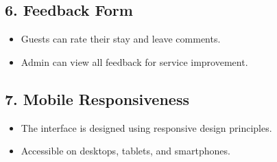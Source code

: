 \documentclass[a4paper,12pt]{article}
\begin{document}
\subsection{6. Feedback Form}
\begin{itemize}
    \item Guests can rate their stay and leave comments.
    \item Admin can view all feedback for service improvement.
\end{itemize}

\subsection{7. Mobile Responsiveness}
\begin{itemize}
    \item The interface is designed using responsive design principles.
    \item Accessible on desktops, tablets, and smartphones.
\end{itemize}
\end{document}
